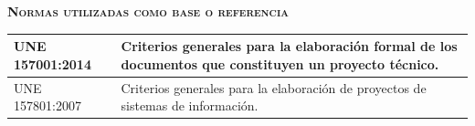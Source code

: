 \vspace{0.8cm}

\textsc{\textbf{Normas utilizadas como base o referencia}}
\vspace{0.4cm}

\begin{tabular}{|l|p{9.5cm}|}
    \hline \hline
    UNE 157001:2014 & Criterios generales para la elaboración formal de los documentos que constituyen un proyecto técnico. \\ \hline
    UNE 157801:2007 & Criterios generales para la elaboración de proyectos de sistemas de información. \\ \hline
    \hline
\end{tabular}
